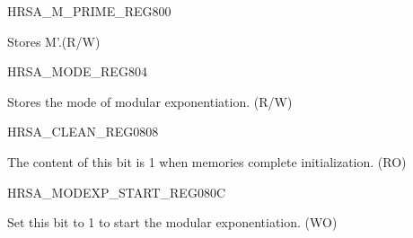 \begin{register}{H}{RSA\_M\_PRIME\_REG}{\hexprefix{}800}\label{regdesc:RSAMPRIMEREG}
%
\regnewline%
\begin{regdesc}\begin{reglist}
\item [RSA\_M\_PRIME\_REG] Stores M'.(R/W)
\end{reglist}\end{regdesc}
\end{register}


\begin{register}{H}{RSA\_MODE\_REG}{\hexprefix{}804}\label{regdesc:RSAMODEREG}
%
%
\regnewline%
\begin{regdesc}\begin{reglist}
\item [RSA\_MODE] Stores the mode of modular exponentiation. (R/W)
\end{reglist}\end{regdesc}
\end{register}



\begin{register}{H}{RSA\_CLEAN\_REG}{\hexprefix{}0808}\label{regdesc:RSACLEANREG}
%
%
\regnewline%
\begin{regdesc}\begin{reglist}
\item [RSA\_CLEAN] The content of this bit is 1 when memories complete initialization. (RO)
\end{reglist}\end{regdesc}
\end{register}


\begin{register}{H}{RSA\_MODEXP\_START\_REG}{\hexprefix{}080C}\label{regdesc:RSAMODEXPSTARTREG}
%
%
\regnewline%
\begin{regdesc}\begin{reglist}
\item [RSA\_MODEXP\_START] Set this bit to 1 to start the modular exponentiation. (WO)
\end{reglist}\end{regdesc}
\end{register}


